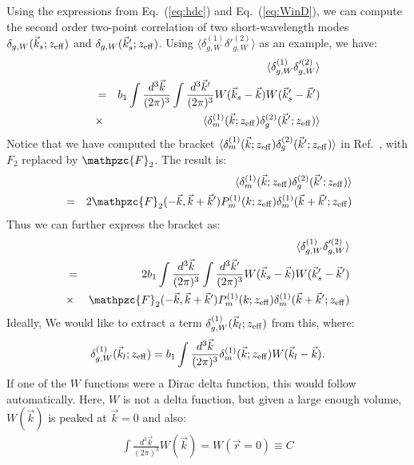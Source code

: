 \documentclass[prd,amsmath,amssymb,floatfix,superscriptaddress,nofootinbib,twocolumn]{revtex4-1}
\newcommand{\vrr}{\vec{r}}
\newcommand{\vs}{\nonumber\\}
\newcommand{\ec}[1]{Eq.~(\ref{eq:#1})}
\newcommand{\eql}[1]{\label{eq:#1}}
\begin{document}
Using the expressions from \ec{hdc} and \ec{WinD}, we can compute the second order two-point correlation of two short-wavelength modes $\delta_{g,W}(\vec{k}_s;z_{\rm eff})$ and $\delta_{g,W}(\vec{k}'_s;z_{\rm eff})$. Using $\langle \delta^{(1)}_{g,W}\delta'^{(2)}_{g,W} \rangle$ as an example, we have:
\begin{eqnarray}
&&\langle \delta^{(1)}_{g,W}\delta'^{(2)}_{g,W} \rangle\nonumber\\
&=&b_{1}\int \frac{d^{3}\vec{k}}{(2\pi)^3}\int \frac{d^{3}\vec{k}'}{(2\pi)^3}W(\vec{k}_s-\vec{k})W(\vec{k}'_s-\vec{k}')\nonumber\\
&\times & \langle \delta^{(1)}_{m}(\vec{k};z_{\rm eff})\delta^{(2)}_{g}(\vec{k}';z_{\rm eff})\rangle
\end{eqnarray}
Notice that we have computed the bracket $\langle \delta^{(1)}_{m}(\vec{k};z_{\rm eff})\delta^{(2)}_{g}(\vec{k}';z_{\rm eff})\rangle$ in Ref.~\cite{Li:2020fir}, with $F_{2}$ replaced by $\mathpzc{F}_{2}$. The result is:
\begin{eqnarray}
&&\langle \delta^{(1)}_{m}(\vec{k};z_{\rm eff})\delta^{(2)}_{g}(\vec{k}';z_{\rm eff})\rangle\vs
&=&2\mathpzc{F}_{2}(-\vec{k},\vec{k}+\vec{k}')P_{m}^{(1)}(k;z_{\rm eff})\delta_{m}^{(1)}(\vec{k}+\vec{k}';z_{\rm eff})
\end{eqnarray}
Thus we can further express the bracket as:
\begin{eqnarray}
&&\langle \delta^{(1)}_{g,W}\delta'^{(2)}_{g,W} \rangle\nonumber\\
&=&2b_{1}\int \frac{d^{3}\vec{k}}{(2\pi)^3}\int \frac{d^{3}\vec{k}'}{(2\pi)^3}W(\vec{k}_s-\vec{k})W(\vec{k}'_s-\vec{k}')\nonumber\\
&\times &\mathpzc{F}_{2}(-\vec{k},\vec{k}+\vec{k}')P_{m}^{(1)}(k;z_{\rm eff})\delta_{m}^{(1)}(\vec{k}+\vec{k}';z_{\rm eff})
\end{eqnarray}
Ideally, We would like to extract a term $\delta^{(1)}_{g,W}(\vec{k}_l;z_{\rm eff})$ from this, where:
\begin{eqnarray}
\delta^{(1)}_{g,W}(\vec{k}_l;z_{\rm eff})=b_{1}\int \frac{d^{3}\vec{k}}{(2\pi)^3}\delta_{m}^{(1)}(\vec{k};z_{\rm eff})W(\vec{k}_l-\vec{k}).
\end{eqnarray}
If one of the $W$ functions were a Dirac delta function, this would follow automatically. Here, $W$ is not a delta function, but given a large enough volume, $W(\vec{k})$ is peaked at $\vec{k}=0$ and also:
\begin{eqnarray}
\int\frac{d^{3}\vec{k}}{(2\pi)^3}W(\vec{k})= W(\vrr=0)\equiv C \eql{defC}
\end{eqnarray}
\end{document}
